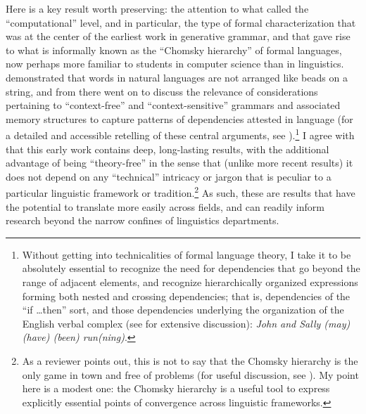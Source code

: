 Here is a key result worth preserving: the attention to what \cite{marr1982vision} called the ``computational'' level, and in particular, the type of formal characterization that was at the center of the earliest work in generative grammar, and that gave rise to what is informally known as the ``Chomsky hierarchy'' of formal languages, now perhaps more familiar to students in computer science than in linguistics. \cite{chomsky1956three,Chomsky1957} demonstrated that words in natural languages are not arranged like beads on a string, and from there went on to discuss the relevance of considerations pertaining to ``context-free'' and ``context-sensitive'' grammars and associated memory structures to capture patterns of dependencies attested in language (for a detailed and accessible retelling of these central arguments, see \cite{lasnik2000syntactic}).\footnote{Without getting into technicalities of formal language theory, I take it to be absolutely essential to recognize the need for dependencies that go beyond the range of adjacent elements, and recognize hierarchically organized expressions forming both nested and crossing dependencies; that is, dependencies of the ``if \ldots then'' sort, and those dependencies underlying the organization of the English verbal complex (see \cite{lasnik2000syntactic} for extensive discussion): \textit{John and Sally (may) (have) (been) run(ning)}.} I agree with \cite{o2005using,fitch2014toward} that this early work contains deep, long-lasting results, with the additional advantage of being ``theory-free'' in the sense that (unlike more recent results) it does not depend on any ``technical'' intricacy or jargon that is peculiar to a particular linguistic framework or tradition.\footnote{As a reviewer points out, this is not to say that the Chomsky hierarchy is the only game in town and free of problems (for useful discussion, see \cite{rogers2011aural}). My point here is a modest one: the Chomsky hierarchy is a useful tool to express explicitly essential points of convergence across linguistic frameworks.} As such, these are results that have the potential to translate more easily across fields, and can readily inform research beyond the narrow confines of linguistics departments.

